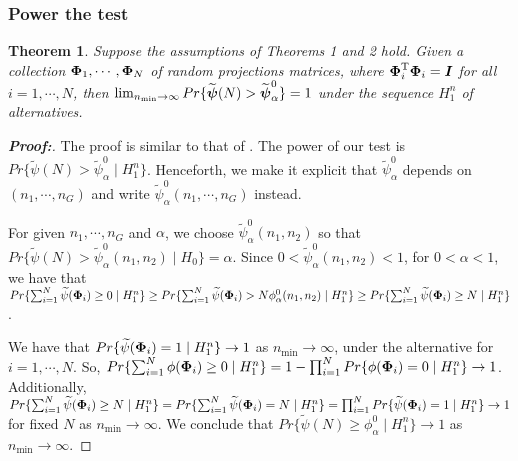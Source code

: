 \documentclass[12pt]{article}
\theoremstyle{plain}%
\newtheorem{theorem}{Theorem}
\theoremstyle{definition}
\def\boldpsi{{\mbox{\boldmath $\psi$}}}
\def\trans{^{\rm T}}
\newcommand{\uI}       {\mbox{\boldmath$I$}}
\newcommand{\uPhi}              {\mbox{\boldmath$\Phi$}}
\begin{document}
\subsubsection{Power the test}
\begin{theorem}
Suppose the assumptions of Theorems 1 and 2 hold.
Given a collection $\uPhi_1, \cdots, \uPhi_N$ of random projections matrices,
where $\uPhi_{i}\trans\uPhi_{i} = \uI$ for all $i = 1, \cdots, N$, then $\lim_{n_{\min} \rightarrow \infty} Pr\{\widetilde{\boldpsi}(N) > \widetilde{\boldpsi}^{0}_{\alpha}\}  = 1$ under the sequence $H^{n}_{1}$ of alternatives.
\end{theorem}
\begin{proof}[\textbf{\upshape Proof:}]
The proof is similar to that of \citealp{zoh2018powerful}.
The power of our test is $Pr\{ \widetilde{\psi}(N) > \widetilde{\psi}^{0}_{\alpha}\mid  H^{n}_{1}\}$.
Henceforth, we make it explicit that $\widetilde{\psi}^{0}_{\alpha}$ depends on $(n_1, \cdots ,n_G)$ and write $\widetilde{\psi}^{0}_{\alpha}(n_1, \cdots, n_G)$ instead.

For given $n_1, \cdots, n_G$ and $\alpha$, we choose $\widetilde{\psi}^{0}_{\alpha}(n_1, n_2)$ so that $Pr\{\widetilde{\psi}(N) > \widetilde{\psi}^{0}_{\alpha}(n_1, n_2)\mid  H_{0}\}  = \alpha$.
Since $ 0 < \widetilde{\psi}^{0}_{\alpha}(n_1, n_2) < 1$, for $0 < \alpha < 1$, we have that $Pr\{ \sum^{N}_{i=1}\widetilde{\psi}(\uPhi_i) \geq             0 \mid H^{n}_{1} \} \geq Pr\{ \sum^{N}_{i=1}\widetilde{\psi}(\uPhi_i) > N\phi^{0}_{\alpha}(n_1, n_2) \mid H^{n}_{1} \} \geq Pr\{ \sum^{N}_{i=1}\widetilde{\psi}(\uPhi_i) \geq N \mid H^{n}_{1} \}$.

We have that $Pr\{\widetilde{\psi}(\uPhi_i) =1 \mid H^{n}_{1}\} \rightarrow 1$ as $n_{\min} \rightarrow \infty$, under the alternative for $i = 1, \cdots, N$. So, $Pr\{ \sum^{N}_{i=1}\phi(\uPhi_i) \geq 0 \mid H^{n}_{1} \} = 1 - \prod_{i=1}^{N}Pr\{\phi(\uPhi_i) = 0 \mid H^{n}_{1} \} \rightarrow 1$.
Additionally, $Pr\{ \sum^{N}_{i=1}\widetilde{\psi}(\uPhi_i) \geq N \mid H^{n}_{1} \} = Pr\{ \sum^{N}_{i=1}\widetilde{\psi}(\uPhi_i) = N \mid H^{n}_{1} \} = \prod_{i=1}^{N}Pr\{\widetilde{\psi}(\uPhi_i) = 1 \mid H^{n}_{1}\} \rightarrow 1$ for fixed $N$ as $n_{\min} \rightarrow \infty$. We conclude that $Pr\{ \widetilde{\psi}(N) \geq \phi^{0}_{\alpha}\mid  H^{n}_{1}\} \rightarrow 1$ as $n_{\min} \rightarrow \infty.$
\end{proof}
\end{document}
